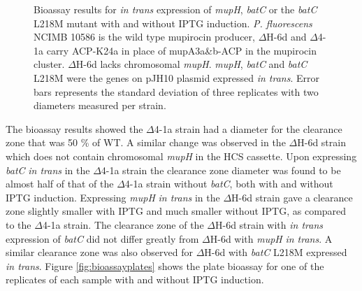 		\setlength\fboxsep{5pt}
		\setlength\fboxrule{1.5pt}
		\begin{figure}[htbp]
		\centering
		\caption[Bioassay results for \textit{in trans} expression of \textit{mupH}, \textit{batC} or the \textit{batC} L218M mutant.]{Bioassay results for \textit{in trans} expression of \textit{mupH}, \textit{batC} or the \textit{batC} L218M mutant with and without IPTG induction. \textit{P. fluorescens} NCIMB 10586 is the wild type mupirocin producer, $ \Delta $H-6d and $ \Delta $4-1a carry ACP-K24a in place of mupA3a\&b-ACP in the mupirocin cluster. $ \Delta $H-6d lacks chromosomal \textit{mupH}. \textit{mupH}, \textit{batC} and \textit{batC} L218M were the genes on pJH10 plasmid expressed \textit{in trans}. Error bars represents the standard deviation of three replicates with two diameters measured per strain.}
		\label{fig:bioassaygraph}
		\end{figure}	
	
	The bioassay results showed the $ \Delta $4-1a strain had a diameter for the clearance zone that was 50 \% of WT. A similar change was  observed in the  $ \Delta $H-6d strain which does not contain chromosomal \textit{mupH} in the HCS cassette. Upon expressing \textit{batC} \textit{in trans} in the $ \Delta $4-1a strain the clearance zone diameter was found to be almost half of that of the $ \Delta $4-1a strain without \textit{batC}, both with and without IPTG induction. Expressing \textit{mupH} \textit{in trans} in the $ \Delta $H-6d strain gave a clearance zone slightly smaller with IPTG and much smaller without IPTG, as compared to the $ \Delta $4-1a strain. The clearance zone of the  $ \Delta $H-6d strain with \textit{in trans} expression of \textit{batC} did not differ greatly from  $ \Delta $H-6d with \textit{mupH} \textit{in trans}. A similar clearance zone was also observed for $ \Delta $H-6d with \textit{batC} L218M expressed \textit{in trans}. Figure \ref{fig:bioassayplates} shows the plate bioassay for one of the replicates of each sample with and without IPTG induction.

